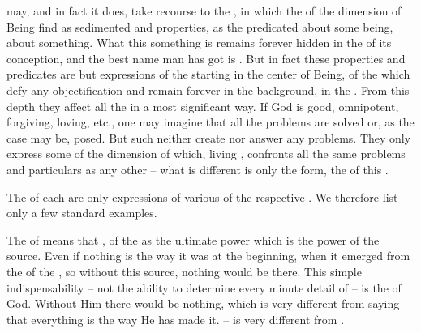 %
 may, and in fact it does, take recourse to the , in which the  of the  dimension of
Being find  as sedimented and  properties, as
the  predicated about some being, about something. What this
something is remains forever hidden in the  of its conception,
and the best name man has got is .  But in fact these properties and
predicates are but expressions of the  starting in the
 center of Being, of the  which defy any
objectification and remain forever in the background, in the .
From this  depth they affect all the  in a most significant way.
If God is good, omnipotent, forgiving, loving, etc., one may imagine that all
  the problems are solved or, as the case may be, posed. But such 
  neither create nor answer any problems. They only express some 
   of the  dimension of  which, living
  \Yes, confronts all the same problems and particulars as any other
   -- what is different is only the form, the  of this
  . 

The  of each  are only expressions of various
 of the respective \nexus. We therefore list only a few standard 
examples.

\label{adhumility} The  of  means
 that ,  of the
 as the ultimate power which is the power of the source.  Even if
nothing  is the way it was at the beginning, when it emerged  from the  of the , so without this
source, nothing would be there. This simple indispensability -- not the
ability to determine every minute detail of  -- is the
 of God.  Without Him there would be nothing, which is very
different from saying that everything is the way He has made it.   -- is very different from 
.
  
